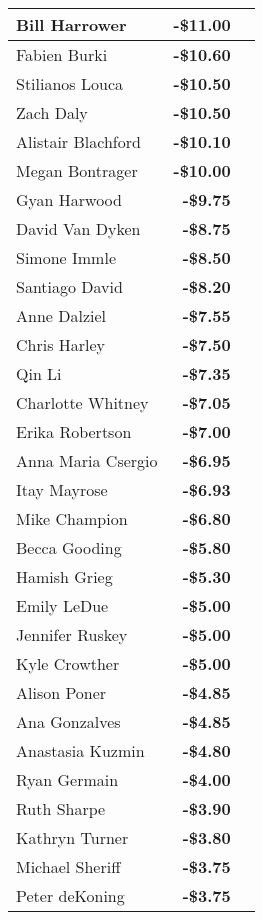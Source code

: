 \begin{longtable}{|l|r|c|}
Bill Harrower & \textbf{-\$11.00} & \\\hline
Fabien Burki & \textbf{-\$10.60} & \\\hline
Stilianos Louca & \textbf{-\$10.50} & \\\hline
Zach Daly & \textbf{-\$10.50} & \\\hline
Alistair Blachford & \textbf{-\$10.10} & \\\hline
Megan Bontrager & \textbf{-\$10.00} & \\\hline
Gyan Harwood & \textbf{-\$9.75} & \\\hline
David Van Dyken & \textbf{-\$8.75} & \\\hline
Simone Immle & \textbf{-\$8.50} & \\\hline
Santiago David & \textbf{-\$8.20} & \\\hline
Anne Dalziel & \textbf{-\$7.55} & \\\hline
Chris Harley & \textbf{-\$7.50} & \\\hline
Qin Li & \textbf{-\$7.35} & \\\hline
Charlotte Whitney & \textbf{-\$7.05} & \\\hline
Erika Robertson & \textbf{-\$7.00} & \\\hline
Anna Maria Csergio & \textbf{-\$6.95} & \\\hline
Itay Mayrose & \textbf{-\$6.93} & \\\hline
Mike Champion & \textbf{-\$6.80} & \\\hline
Becca Gooding & \textbf{-\$5.80} & \\\hline
Hamish Grieg & \textbf{-\$5.30} & \\\hline
Emily LeDue & \textbf{-\$5.00} & \\\hline
Jennifer Ruskey & \textbf{-\$5.00} & \\\hline
Kyle Crowther & \textbf{-\$5.00} & \\\hline
Alison Poner & \textbf{-\$4.85} & \\\hline
Ana Gonzalves & \textbf{-\$4.85} & \\\hline
Anastasia Kuzmin & \textbf{-\$4.80} & \\\hline
Ryan Germain & \textbf{-\$4.00} & \\\hline
Ruth Sharpe & \textbf{-\$3.90} & \\\hline
Kathryn Turner & \textbf{-\$3.80} & \\\hline
Michael Sheriff & \textbf{-\$3.75} & \\\hline
Peter deKoning & \textbf{-\$3.75} & \\\hline

\end{longtable}
